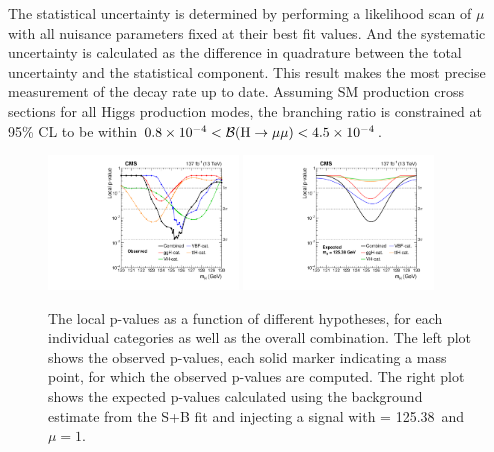 The statistical uncertainty is determined by performing a likelihood scan of $\mu$ with all nuisance parameters fixed at their best fit values.
And the systematic uncertainty is calculated as the difference in quadrature between the total uncertainty and the statistical component.
This result makes the most precise measurement of the \hmm decay rate up to date.
Assuming SM production cross sections for all Higgs production modes, 
the \hmm branching ratio is constrained at 95\% CL to be within $0.8 \times 10^{-4} < {\mathcal{B}(\mathrm{H} \to \mu\mu)} < 4.5 \times 10^{-4}$.

\begin{figure}[!htb]
    \centering
    \captionsetup{justification=justified}
    \includegraphics[width=0.45\textwidth]{pics/results/p-value_obs.pdf}
    \includegraphics[width=0.45\textwidth]{pics/results/p-value_exp.pdf}
    \caption{The local p-values as a function of different \mh hypotheses, 
             for each individual categories as well as the overall combination.
             The left plot shows the observed p-values, 
             each solid marker indicating a mass point, for which the observed p-values are computed.
             The right plot shows the expected p-values calculated using the background estimate from the S+B fit 
             and injecting a signal with \mh = 125.38~\GeV and $\mu = 1$.}
    \label{fig:p_value_scan}
\end{figure}

